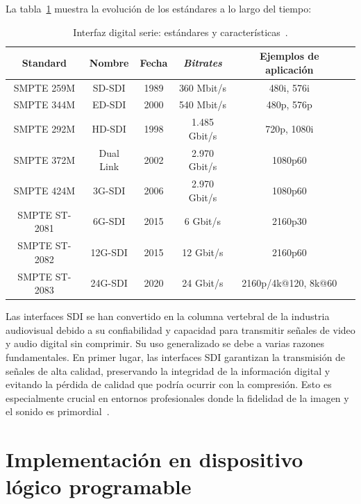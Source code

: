   La tabla~\ref{tab:sdi_standards} muestra la evolución de los estándares a lo
  largo del tiempo:

  \begin{table}[h]
      \caption{Interfaz digital serie: estándares y características~\citep{castr}.}\label{tab:sdi_standards}
      \centering
      \begin{tabular}{cccccc}
          \toprule
          \textbf{Standard} & \textbf{Nombre} & \textbf{Fecha} & \textbf{\textit{Bitrates}} & \textbf{Ejemplos de aplicación} \\
          \midrule
          SMPTE 259M      & SD-SDI    & 1989 & 360 Mbit/s     & 480i, 576i \\
          SMPTE 344M      & ED-SDI    & 2000 & 540 Mbit/s     & 480p, 576p \\
          SMPTE 292M      & HD-SDI    & 1998 & 1.485 Gbit/s   & 720p, 1080i \\
          SMPTE 372M      & Dual Link & 2002 & 2.970 Gbit/s   & 1080p60 \\
          SMPTE 424M      & 3G-SDI    & 2006 & 2.970 Gbit/s   & 1080p60 \\
          SMPTE ST-2081   & 6G-SDI    & 2015 & 6 Gbit/s       & 2160p30 \\
          SMPTE ST-2082   & 12G-SDI   & 2015 & 12 Gbit/s      & 2160p60 \\
          SMPTE ST-2083   & 24G-SDI   & 2020 & 24 Gbit/s      & 2160p/4k@120, 8k@60 \\
          \bottomrule
      \end{tabular}
  \end{table}

  Las interfaces SDI se han convertido en la columna vertebral de la industria
  audiovisual debido a su confiabilidad y capacidad para transmitir señales de
  video y audio digital sin comprimir. Su uso generalizado se debe a varias
  razones fundamentales. En primer lugar, las interfaces SDI garantizan la
  transmisión de señales de alta calidad, preservando la integridad de la
  información digital y evitando la pérdida de calidad que podría ocurrir con la
  compresión. Esto es especialmente crucial en entornos profesionales donde la
  fidelidad de la imagen y el sonido es primordial~\citep{castr}.

\section{Implementación en dispositivo lógico programable}

